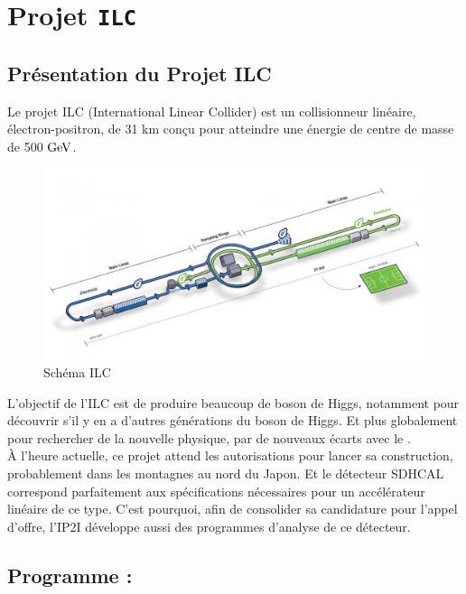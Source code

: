
\chapter{Projet \texttt{ILC}}

\section{Présentation du Projet ILC}

Le projet ILC (International Linear Collider) est un collisionneur linéaire, électron-positron, de 31 km conçu pour atteindre une énergie de centre de masse de 500 $\mathrm{GeV}$\cite{cern:ilc}. \\

\begin{figure}[h!]
	\center
	\includegraphics[width=\textwidth]{../img/ilc.jpg} 
	\caption{Schéma ILC\cite{cern:ilc}}
	\label{ilc:schema}
\end{figure}

L'objectif de l'ILC est de produire beaucoup de boson de Higgs, notamment pour découvrir s'il y en a d'autres générations du boson de Higgs. Et plus globalement pour rechercher de la nouvelle physique, par de nouveaux écarts avec le \MS.\\

À l'heure actuelle, ce projet attend les autorisations pour lancer sa construction, probablement dans les montagnes au nord du Japon. 
Et le détecteur SDHCAL correspond parfaitement aux spécifications nécessaires pour un accélérateur linéaire de ce type.
C'est pourquoi, afin de consolider sa candidature pour l'appel d'offre, l'IP2I développe aussi des programmes d'analyse de ce détecteur.

\section{Programme : \original}

